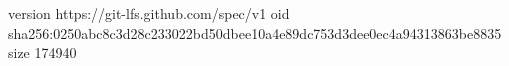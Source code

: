 version https://git-lfs.github.com/spec/v1
oid sha256:0250abc8c3d28c233022bd50dbee10a4e89dc753d3dee0ec4a94313863be8835
size 174940
